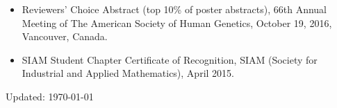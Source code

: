 \documentclass[overlapped, line, 10pt]{res} %
\begin{document}
\begin{resume}
\begin{itemize} \itemsep -2pt %
  \item Reviewers’ Choice Abstract (top 10\% of poster abstracts), 66th Annual Meeting of The American Society of Human Genetics, October 19, 2016, Vancouver, Canada.
  \item SIAM Student Chapter Certificate of Recognition, SIAM (Society for Industrial and Applied Mathematics), April 2015.
\end{itemize}

\vfill
\centerline{Updated: \today}


\end{resume}
\end{document}
